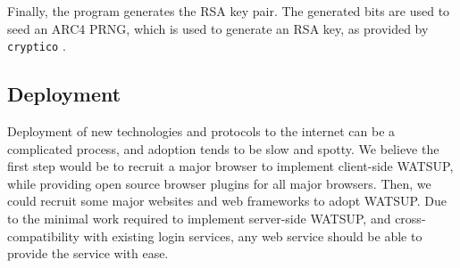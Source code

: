 Finally, the program generates the RSA key pair. The generated bits are used to seed an ARC4 PRNG, which is used to generate an RSA key, as provided by \texttt{cryptico} \cite{Terrell:2017}.

\subsection{Deployment}

Deployment of new technologies and protocols to the internet can be a complicated process, and adoption tends to be slow and spotty. We believe the first step would be to recruit a major browser to implement client-side WATSUP, while providing open source browser plugins for all major browsers. Then, we could recruit some major websites and web frameworks to adopt WATSUP. Due to the minimal work required to implement server-side WATSUP, and cross-compatibility with existing login services, any web service should be able to provide the service with ease.

